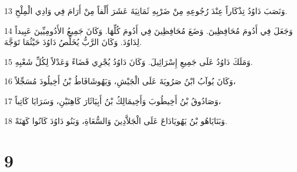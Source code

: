 \par 13 وَنَصَبَ دَاوُدُ تِذْكَاراً عِنْدَ رُجُوعِهِ مِنْ ضَرْبِهِ ثَمَانِيَةَ عَشَرَ أَلْفاً مِنْ أَرَامَ فِي وَادِي الْمِلْحِ.
\par 14 وَجَعَلَ فِي أَدُومَ مُحَافِظِينَ. وَضَعَ مُحَافِظِينَ فِي أَدُومَ كُلِّهَا. وَكَانَ جَمِيعُ الأَدُومِيِّينَ عَبِيداً لِدَاوُدَ. وَكَانَ الرَّبُّ يُخَلِّصُ دَاوُدَ حَيْثُمَا تَوَجَّهَ.
\par 15 وَمَلَكَ دَاوُدُ عَلَى جَمِيعِ إِسْرَائِيلَ. وَكَانَ دَاوُدُ يُجْرِي قَضَاءً وَعَدْلاً لِكُلِّ شَعْبِهِ.
\par 16 وَكَانَ يُوآبُ ابْنُ صَرُويَةَ عَلَى الْجَيْشِ، وَيَهُوشَافَاطُ بْنُ أَخِيلُودَ مُسَجِّلاً،
\par 17 وَصَادُوقُ بْنُ أَخِيطُوبَ وَأَخِيمَالِكُ بْنُ أَبِيَاثَارَ كَاهِنَيْنِ، وَسَرَايَا كَاتِباً،
\par 18 وَبَنَايَاهُو بْنُ يَهُويَادَاعَ عَلَى الْجَلاَّدِينَ وَالسُّعَاةِ، وَبَنُو دَاوُدَ كَانُوا كَهَنَةً.

\chapter{9}

